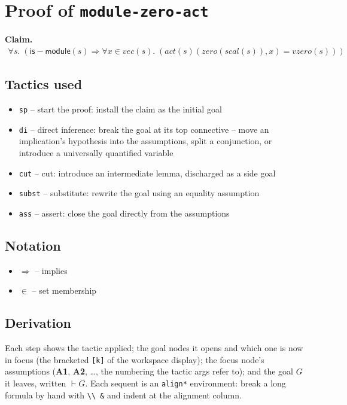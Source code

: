 \documentclass[11pt]{article}
\begin{document}
\section*{Proof of \texttt{module-zero-act}}
\textbf{Claim.}
\begin{align*}
  \forall s.\; (\mathsf{is{-}module}(s) \Rightarrow \forall x \in \mathit{vec}(s).\; (\mathit{act}(s)(\mathit{zero}(\mathit{scal}(s)), x) = \mathit{vzero}(s)))
\end{align*}
\bigskip

\subsection*{Tactics used}
\begin{itemize}
\item \texttt{sp} -- start the proof: install the claim as the initial goal
\item \texttt{di} -- direct inference: break the goal at its top connective -- move an implication's hypothesis into the assumptions, split a conjunction, or introduce a universally quantified variable
\item \texttt{cut} -- cut: introduce an intermediate lemma, discharged as a side goal
\item \texttt{subst} -- substitute: rewrite the goal using an equality assumption
\item \texttt{ass} -- assert: close the goal directly from the assumptions
\end{itemize}

\subsection*{Notation}
\begin{itemize}
\item $\Rightarrow$ -- implies
\item $\in$ -- set membership
\end{itemize}

\subsection*{Derivation}
Each step shows the tactic applied; the goal nodes it opens and which one is now in focus (the bracketed \texttt{[k]} of the workspace display); the focus node's assumptions (\textbf{A1}, \textbf{A2}, \dots{}, the numbering the tactic args refer to); and the goal $G$ it leaves, written $\vdash G$.  Each sequent is an \texttt{align*} environment: break a long formula by hand with \texttt{\textbackslash\textbackslash\ \&} and indent at the alignment column.
\end{document}

